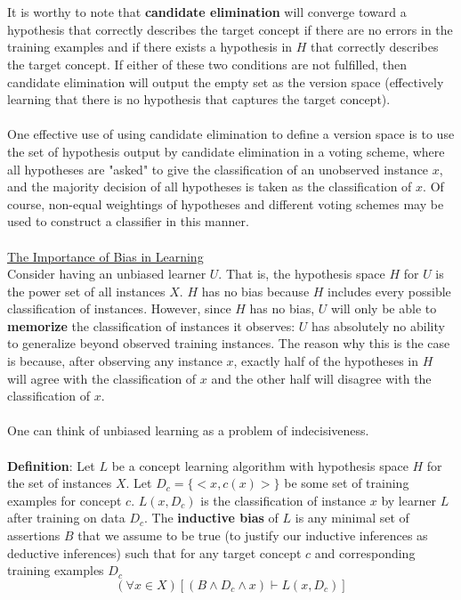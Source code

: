 \documentclass[11pt]{article}
\begin{document}
\\
\\
It is worthy to note that \textbf{candidate elimination} will converge toward a hypothesis that correctly describes the target concept if there are no errors in the training examples and if there exists a hypothesis in $H$ that correctly describes the target concept. If either of these two conditions are not fulfilled, then candidate elimination will output the empty set as the version space (effectively learning that there is no hypothesis that captures the target concept).
\\
\\
One effective use of using candidate elimination to define a version space is to use the set of hypothesis output by candidate elimination in a voting scheme, where all hypotheses are "asked" to give the classification of an unobserved instance $x$, and the majority decision of all hypotheses is taken as the classification of $x$. Of course, non-equal weightings of hypotheses and different voting schemes may be used to construct a classifier in this manner.
\\
\\
\underline{The Importance of Bias in Learning}\\
Consider having an unbiased learner $U$. That is, the hypothesis space $H$ for $U$ is the power set of all instances $X$. $H$ has no bias because $H$ includes every possible classification of instances. However, since $H$ has no bias, $U$ will only be able to \textbf{memorize} the classification of instances it observes: $U$ has absolutely no ability to generalize beyond observed training instances. The reason why this is the case is because, after observing any instance $x$, exactly half of the hypotheses in $H$ will agree with the classification of $x$ and the other half will disagree with the classification of $x$.
\\
\\
One can think of unbiased learning as a problem of indecisiveness.
\\
\\
\textbf{Definition}: Let $L$ be a concept learning algorithm with hypothesis space $H$ for the set of instances $X$. Let $D_c = \{ <x,c(x)>\}$ be some set of training examples for concept $c$. $L(x, D_c)$ is the classification of instance $x$ by learner $L$ after training on data $D_c$. The \textbf{inductive bias} of $L$ is any minimal set of assertions $B$ that we assume to be true (to justify our inductive inferences as deductive inferences) such that for any target concept $c$ and corresponding training examples $D_c$ $$(\forall x \in X)[(B \wedge D_c \wedge x) \vdash L(x,D_c)]$$
\end{document}
